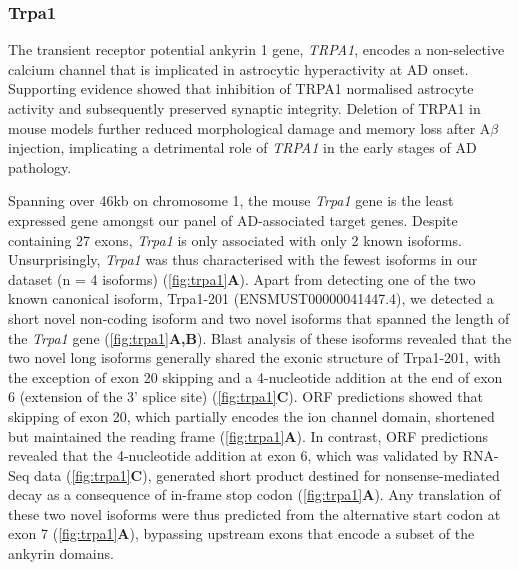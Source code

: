 \newpage
\subsubsection{Trpa1}
The transient receptor potential ankyrin 1 gene, \textit{TRPA1}, encodes a non-selective calcium channel that is implicated in astrocytic hyperactivity at AD onset\cite{Payrits2020}. Supporting evidence showed that inhibition of TRPA1 normalised astrocyte activity and subsequently preserved synaptic integrity\cite{Lee2016a}. Deletion of TRPA1 in mouse models further reduced morphological damage and memory loss after A$\beta$ injection, implicating a detrimental role of \textit{TRPA1} in the early stages of AD pathology.\cite{Payrits2020}

Spanning over 46kb on chromosome 1, the mouse \textit{Trpa1} gene is the least expressed gene amongst our panel of AD-associated target genes. Despite containing 27 exons, \textit{Trpa1} is only associated with only 2 known isoforms. Unsurprisingly, \textit{Trpa1} was thus characterised with the fewest isoforms in our dataset (n = 4 isoforms) (\cref{fig:trpa1}\textbf{A}). Apart from detecting one of the two known canonical isoform, Trpa1-201 (ENSMUST00000041447.4), we detected a short novel non-coding isoform and two novel isoforms that spanned the length of the \textit{Trpa1} gene (\cref{fig:trpa1}\textbf{A,B}). Blast analysis of these isoforms revealed that the two novel long isoforms generally shared the exonic structure of Trpa1-201, with the exception of exon 20 skipping and a 4-nucleotide addition at the end of exon 6 (extension of the 3' splice site) (\cref{fig:trpa1}\textbf{C}). ORF predictions showed that skipping of exon 20, which partially encodes the ion channel domain, shortened but maintained the reading frame (\cref{fig:trpa1}\textbf{A}). In contrast, ORF predictions revealed that the 4-nucleotide addition at exon 6, which was validated by RNA-Seq data (\cref{fig:trpa1}\textbf{C}), generated short product destined for nonsense-mediated decay as a consequence of in-frame stop codon (\cref{fig:trpa1}\textbf{A}). Any translation of these two novel isoforms were thus predicted from the alternative start codon at exon 7 (\cref{fig:trpa1}\textbf{A}), bypassing upstream exons that encode a subset of the ankyrin domains.     


